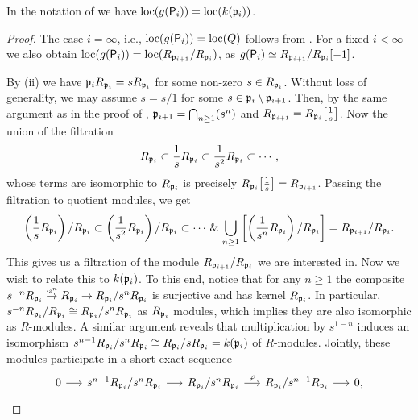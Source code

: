 \documentclass[reqno,a4paper]{amsart}
\begin{document}
\begin{proposition}\label{prop:BFreduction}
In the notation of  we have $\operatorname{loc}(g(\mathsf{P}_i))=\operatorname{loc}(k(\mathfrak{p}_i))$. 
\end{proposition}
\begin{proof}
The case $i=\infty$, i.e., $\operatorname{loc}(g(\mathsf{P}_i))=\operatorname{loc}(Q)$ follows from .  For a fixed $i<\infty$ we also obtain $\operatorname{loc}(g(\mathsf{P}_i))=\operatorname{loc}(R_{\mathfrak{p}_{i+1}}/R_{\mathfrak{p}_{i}})$, as $g(\mathsf{P}_i)\simeq R_{\mathfrak{p}_{i+1}}/R_{\mathfrak{p}_{i}}[-1]$.

By (ii) we have $\mathfrak{p}_{i}R_{\mathfrak{p}_{i}}=sR_{\mathfrak{p}_{i}}$ for some non-zero $s\in R_{\mathfrak{p}_{i}}$. Without loss of generality, we may assume $s=s/1$ for some $s\in \mathfrak{p}_i\setminus\mathfrak{p}_{i+1}$. 
Then, by the same argument as in the proof of , $\mathfrak{p}_{i+1}= \bigcap_{n\ge1}(s^n)$ and $R_{\mathfrak{p}_{i+1}}=R_{\mathfrak{p}_{i}}\big[\frac{1}{s}\big]$. Now the union of the filtration
\[
R_{\mathfrak{p}_i}\subset \frac{1}{s}R_{\mathfrak{p}_{i}}\subset \frac{1}{s^2}R_{\mathfrak{p}_{i}}\subset \cdots,
\]
whose terms are isomorphic to  $R_{\mathfrak{p}_{i}}$ is precisely $R_{\mathfrak{p}_{i}}\big[\frac{1}{s}\big]=R_{\mathfrak{p}_{i+1}}$. %
Passing the filtration to quotient modules, we get
\begin{equation}\label{eq:locFiltration}
\begin{aligned}
   \left(\frac{1}{s}R_{\mathfrak{p}_{i}}\right)/R_{\mathfrak{p}_{i}}\subset \left(\frac{1}{s^2}R_{\mathfrak{p}_{i}}\right)/R_{\mathfrak{p}_{i}}\subset \cdots\,\&\,\bigcup\limits_{n\ge1} \left[\left(\frac{1}{s^n}R_{\mathfrak{p}_{i}}\right)/R_{\mathfrak{p}_{i}}\right]=R_{\mathfrak{p}_{i+1}}/R_{\mathfrak{p}_{i}}.
   \end{aligned}
\end{equation}
This gives us a filtration of the module $R_{\mathfrak{p}_{i+1}}/R_{\mathfrak{p}_{i}}$ we are interested in. Now we wish to relate this to $k(\mathfrak{p}_i)$. To this end, notice that for any $n\ge1$ the composite $s^{-n}R_{\mathfrak{p}_{i}}\stackrel{\textrm{\tiny $\cdot s^n$}}{\to} R_{\mathfrak{p}_{i}}\to R_{\mathfrak{p}_{i}}/s^nR_{\mathfrak{p}_{i}}$ is surjective and has kernel $R_{\mathfrak{p}_{i}}$. In particular, $s^{-n}R_{\mathfrak{p}_{i}}/R_{\mathfrak{p}_{i}}\cong R_{\mathfrak{p}_{i}}/s^nR_{\mathfrak{p}_{i}}$ as $R_{\mathfrak{p}_{i}}$ modules, which implies they are also isomorphic as $R$-modules. A similar argument reveals that multiplication by $s^{1-n}$ induces an isomorphism $s^{n-1}R_{\mathfrak{p}_{i}}/s^nR_{\mathfrak{p}_{i}}\cong R_{\mathfrak{p}_{i}}/ sR_{\mathfrak{p}_{i}}=k(\mathfrak{p}_i)$ of $R$-modules. Jointly, these modules participate in a short exact sequence
\[
\begin{tikzcd}[row sep=0.5cm,column sep=0.5cm]
0 \arrow[r] & s^{n-1}R_{\fp_{i}}/s^nR_{\fp_{i}} \arrow[r] & R_{\fp_{i}}/s^nR_{\fp_{i}} \arrow[r, "\varphi"] & R_{\fp_{i}}/s^{n-1}R_{\fp_{i}} \arrow[r] & 0,

\end{tikzcd}\]
\end{proof}
\end{document}
